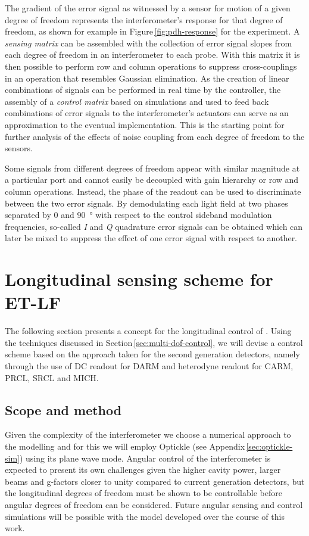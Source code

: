 The gradient of the error signal as witnessed by a sensor for motion of a given degree of freedom represents the interferometer's response for that degree of freedom, as shown for example in Figure\,\ref{fig:pdh-response} for the \SSM{} experiment. A \emph{sensing matrix} can be assembled with the collection of error signal slopes from each degree of freedom in an interferometer to each probe. With this matrix it is then possible to perform row and column operations to suppress cross-couplings in an operation that resembles Gaussian elimination. As the creation of linear combinations of signals can be performed in real time by the controller, the assembly of a \emph{control matrix} based on simulations and used to feed back combinations of error signals to the interferometer's actuators can serve as an approximation to the eventual implementation. This is the starting point for further analysis of the effects of noise coupling from each degree of freedom to the sensors.

Some signals from different degrees of freedom appear with similar magnitude at a particular port and cannot easily be decoupled with gain hierarchy or row and column operations. Instead, the phase of the readout can be used to discriminate between the two error signals. By demodulating each light field at two phases separated by \num{0} and \SI{90}{\degree} with respect to the control sideband modulation frequencies, so-called \emph{I} and \emph{Q} quadrature error signals can be obtained which can later be mixed to suppress the effect of one error signal with respect to another.

\section{Longitudinal sensing scheme for ET-LF}
The following section presents a concept for the longitudinal control of \ETLF{}. Using the techniques discussed in Section\,\ref{sec:multi-dof-control}, we will devise a control scheme based on the approach taken for the second generation detectors, namely through the use of \gls{DC} readout for \gls{DARM} and heterodyne readout for \gls{CARM}, \gls{PRCL}, \gls{SRCL} and \gls{MICH}.

\subsection{Scope and method}
Given the complexity of the interferometer we choose a numerical approach to the modelling and for this we will employ Optickle (see Appendix\,\ref{sec:optickle-sim}) using its plane wave mode. Angular control of the interferometer is expected to present its own challenges given the higher cavity power, larger beams and g-factors closer to unity compared to current generation detectors, but the longitudinal degrees of freedom must be shown to be controllable before angular degrees of freedom can be considered. Future angular sensing and control simulations will be possible with the model developed over the course of this work.

